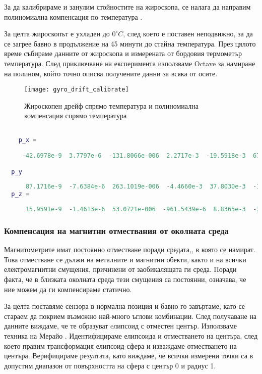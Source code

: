 За да калибрираме и занулим стойностите на жироскопа,
се налага да направим полиномиална компенсация по температура \cite{ma2017real}.

За целта жироскопът е ухладен до \(0^{\circ}C\),
след което е поставен неподвижно, за да се загрее бавно в продължение на 45 минути до стайна температура.
През цялото време събираме данните от жироскопа и измерената от бордовия термометър температура.
След приключване на експеримента използваме Octave за намиране на полином,
който точно описва получените данни за всяка от осите.

\begin{figure}[htpb!]
    \centering
    \texttt{[image: gyro\_drift\_calibrate]}
    \caption{Жироскопен дрейф спрямо температура и полиномиална компенсация спрямо температура}
    \label{fig:gyro_drift_calibrate}
\end{figure}

\begin{lstlisting}[language=matlab, caption={Получени полиноми за компенсация на жироскопния дрейф}, label={lst:gyro_drift_poly}]

    p_x =

     -42.6978e-9  3.7797e-6  -131.8066e-006  2.2717e-3  -19.5918e-3  67.9744e-3  95.1384e-3  2.2440e+0

  p_y 
  
      87.1716e-9  -7.6384e-6  263.1019e-006  -4.4660e-3  37.8030e-3  -129.2365e-3  -191.6577e-3  -1.1695e+0
  p_z =
  
      15.9591e-9  -1.4613e-6  53.0721e-006  -961.5439e-6  8.8365e-3  -33.3197e-3  -44.0584e-003  -1.9076e+0

\end{lstlisting}


\FloatBarrier


\subsubsection{Компенсация на магнитни отмествания от околната среда}
\FloatBarrier
Магнитометрите имат постоянно отместване поради средата,, в която се намират.
Това отместване се дължи на металните и магнитни обекти,
както и на всички електромагнитни смущения, причинени от заобикалящата ги среда.
Поради факта, че в близката околната среда тези смущения са постоянни, означава, че ние можем да ги компенсираме статично.

За целта поставяме сензора в нормална позиция и бавно го завъртаме, като се стараем да покрием възможно най-много ъглови комбинации.
След получаване на данните виждаме, че те образуват eлипсоид с отместен център.
Използваме техника на Мерайо \cite{merayo2000scalar}.
Идентифицираме елипсоида и отместването на центъра,
след което правим трансформация елипсоид-сфера и изваждаме отместването на центъра.
Верифицираме резултата, като виждаме, че всички измерени точки са в допустим диапазон от повърхността на сфера с център 0 и радиус 1.

